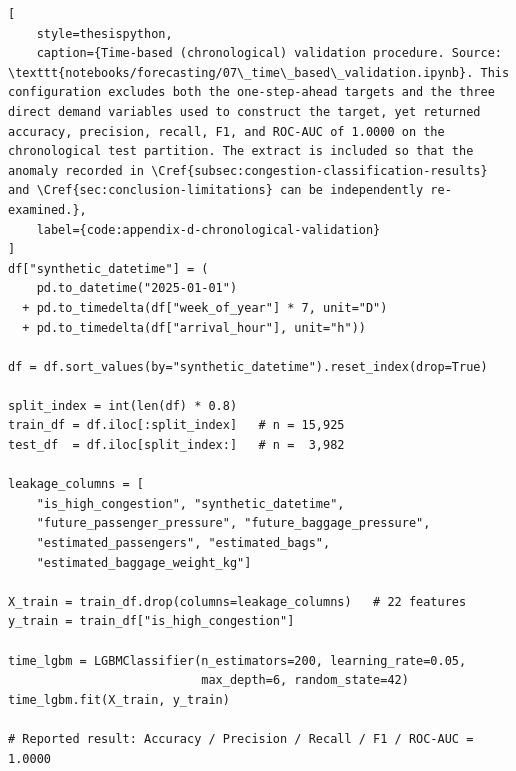 \begin{lstlisting}[
    style=thesispython,
    caption={Time-based (chronological) validation procedure. Source: \texttt{notebooks/forecasting/07\_time\_based\_validation.ipynb}. This configuration excludes both the one-step-ahead targets and the three direct demand variables used to construct the target, yet returned accuracy, precision, recall, F1, and ROC-AUC of 1.0000 on the chronological test partition. The extract is included so that the anomaly recorded in \Cref{subsec:congestion-classification-results} and \Cref{sec:conclusion-limitations} can be independently re-examined.},
    label={code:appendix-d-chronological-validation}
]
df["synthetic_datetime"] = (
    pd.to_datetime("2025-01-01")
  + pd.to_timedelta(df["week_of_year"] * 7, unit="D")
  + pd.to_timedelta(df["arrival_hour"], unit="h"))

df = df.sort_values(by="synthetic_datetime").reset_index(drop=True)

split_index = int(len(df) * 0.8)
train_df = df.iloc[:split_index]   # n = 15,925
test_df  = df.iloc[split_index:]   # n =  3,982

leakage_columns = [
    "is_high_congestion", "synthetic_datetime",
    "future_passenger_pressure", "future_baggage_pressure",
    "estimated_passengers", "estimated_bags",
    "estimated_baggage_weight_kg"]

X_train = train_df.drop(columns=leakage_columns)   # 22 features
y_train = train_df["is_high_congestion"]

time_lgbm = LGBMClassifier(n_estimators=200, learning_rate=0.05,
                           max_depth=6, random_state=42)
time_lgbm.fit(X_train, y_train)

# Reported result: Accuracy / Precision / Recall / F1 / ROC-AUC = 1.0000
\end{lstlisting}


